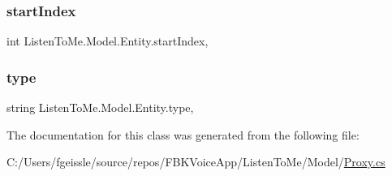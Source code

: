 \subsubsection{\texorpdfstring{start\+Index}{startIndex}}
{\footnotesize\ttfamily int Listen\+To\+Me.\+Model.\+Entity.\+start\+Index\hspace{0.3cm}{\ttfamily [get]}, {\ttfamily [set]}}

\mbox{\label{class_listen_to_me_1_1_model_1_1_entity_af2daeab3bb0f1ec71b0664aad418ac65}} 
\subsubsection{\texorpdfstring{type}{type}}
{\footnotesize\ttfamily string Listen\+To\+Me.\+Model.\+Entity.\+type\hspace{0.3cm}{\ttfamily [get]}, {\ttfamily [set]}}



The documentation for this class was generated from the following file\+:\begin{DoxyCompactItemize}
\item 
C\+:/\+Users/fgeissle/source/repos/\+F\+B\+K\+Voice\+App/\+Listen\+To\+Me/\+Model/\mbox{\hyperlink{_proxy_8cs}{Proxy.\+cs}}\end{DoxyCompactItemize}
